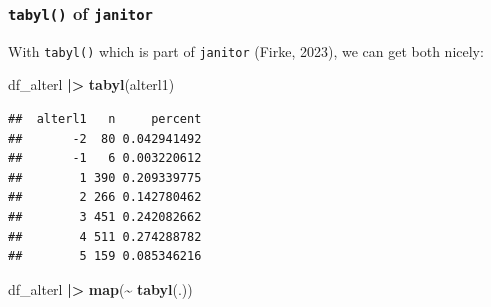 \documentclass[
  doc]{apa6}
\newenvironment{Shaded}{\begin{snugshade}}{\end{snugshade}}
\newcommand{\FunctionTok}[1]{\textcolor[rgb]{0.13,0.29,0.53}{\textbf{#1}}}
\newcommand{\NormalTok}[1]{#1}
\newcommand{\SpecialCharTok}[1]{\textcolor[rgb]{0.81,0.36,0.00}{\textbf{#1}}}
\begin{document}
\hypertarget{tabyl-of-janitor}{%
\subsubsection{\texorpdfstring{\texttt{tabyl()} of \texttt{janitor}}{tabyl() of janitor}}\label{tabyl-of-janitor}}

With \texttt{tabyl()} which is part of \texttt{janitor} (Firke, 2023), we can get both nicely:

\begin{Shaded}
\begin{Highlighting}[]
\NormalTok{df\_alterl }\SpecialCharTok{|\textgreater{}} 
  \FunctionTok{tabyl}\NormalTok{(alterl1) }
\end{Highlighting}
\end{Shaded}

\begin{verbatim}
##  alterl1   n     percent
##       -2  80 0.042941492
##       -1   6 0.003220612
##        1 390 0.209339775
##        2 266 0.142780462
##        3 451 0.242082662
##        4 511 0.274288782
##        5 159 0.085346216
\end{verbatim}

\begin{Shaded}
\begin{Highlighting}[]
\NormalTok{df\_alterl }\SpecialCharTok{|\textgreater{}} 
  \FunctionTok{map}\NormalTok{(}\SpecialCharTok{\textasciitilde{}} \FunctionTok{tabyl}\NormalTok{(.))}
\end{Highlighting}
\end{Shaded}
\end{document}
